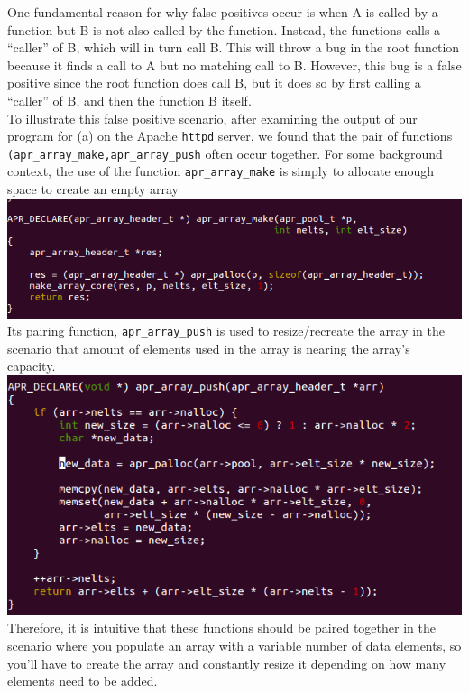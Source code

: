 \documentclass{article}
\begin{document}
One fundamental reason for why false positives occur is when A is called by a function but B is not also called by the function. Instead, the functions calls a ``caller'' of B, which will in turn call B. This will throw a bug in the root function because it finds a call to A but no matching call to B. However, this bug is a false positive since the root function does call B, but it does so by first calling a ``caller'' of B, and then the function B itself. \\
To illustrate this false positive scenario, after examining the output of our program for (a) on the Apache \verb|httpd| server, we found that the pair of functions \verb|(apr_array_make,apr_array_push| often occur together. 
For some background context, the use of the function \verb|apr_array_make| is simply to allocate enough space to create an empty array \\
\includegraphics[scale=0.5]{ss/apr_array_make_def.png} \\
Its pairing function, \verb|apr_array_push| is used to resize/recreate the array in the scenario that amount of elements used in the array is nearing the array's capacity. \\
\includegraphics[scale=0.5]{ss/apr_array_push_def.png} \\
Therefore, it is intuitive that these functions should be paired together in the scenario where you populate an array with a variable number of data elements, so you'll have to create the array and constantly resize it depending on how many elements need to be added. \\
\end{document}
